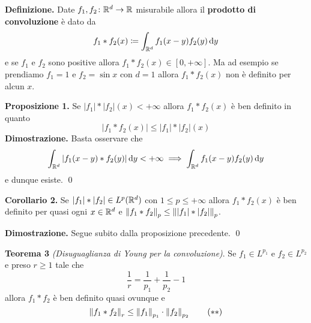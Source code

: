 \documentclass[a4paper, 12pt]{report}
\begin{document}
\textbf{Definizione.}
Date $f_1, f_2 \colon \mathbb R^d \to \mathbb R$ misurabile allora il \textbf{prodotto di convoluzione} è dato da
$$
f_1 \ast f_2 (x) \coloneqq \int_{\mathbb R^d} f_1(x - y) f_2(y) \,\mathrm{d} y
$$
e se $f_1$ e $f_2$ sono positive allora $f_1 \ast f_2(x) \in [0, +\infty]$. Ma ad esempio se prendiamo $f_1 = 1$ e $f_2 = \sin x$ con $d = 1$ allora $f_1 \ast f_2(x)$ non è definito per alcun $x$.

\textbf{Proposizione 1.}
Se $|f_1| \ast |f_2| (x) < +\infty$ allora $f_1 \ast f_2(x)$ è ben definito in quanto
$$
|f_1 \ast f_2(x)| \leq |f_1| \ast |f_2|(x)
$$
\textbf{Dimostrazione.}
Basta osservare che
$$
\int_{\mathbb R^d} |f_1(x - y) \ast f_2(y)| \,\mathrm{d} y < +\infty 
\implies \int_{\mathbb R^d} f_1(x - y) f_2(y) \,\mathrm{d} y
$$
e dunque esiste.
\qed

\textbf{Corollario 2.}
Se $|f_1| \ast |f_2| \in L^p(\mathbb R^d)$ con $1 \leq p \leq +\infty$ allora $f_1 \ast f_2(x)$ è ben definito per quasi ogni $x \in \mathbb R^d$ e $\left\lVert f_1 \ast f_2 \right\rVert_p \leq \left\lVert |f_1| \ast |f_2| \right\rVert_p$.

\textbf{Dimostrazione.}
Segue subito dalla proposizione precedente.
\qed

\textbf{Teorema 3} \textit{(Disuguaglianza di Young per la convoluzione)}.
Se $f_1 \in L^{p_1}$ e $f_2 \in L^{p_2}$ e preso $r \geq 1$ tale che
\begin{equation}\label{eqn:conv_th3_cond}
	\frac{1}{r} = \frac{1}{p_1} + \frac{1}{p_2} - 1
	\tag{$*$}
\end{equation}
allora $f_1 \ast f_2$ è ben definito quasi ovunque e
\begin{equation}\label{eqn:conv_th3_thesis}
	\left\lVert f_1 \ast f_2 \right\rVert_r \leq \left\lVert f_1 \right\rVert_{p_1} \cdot \left\lVert f_2 \right\rVert_{p_2}
	\tag{$**$}
\end{equation}
\end{document}
